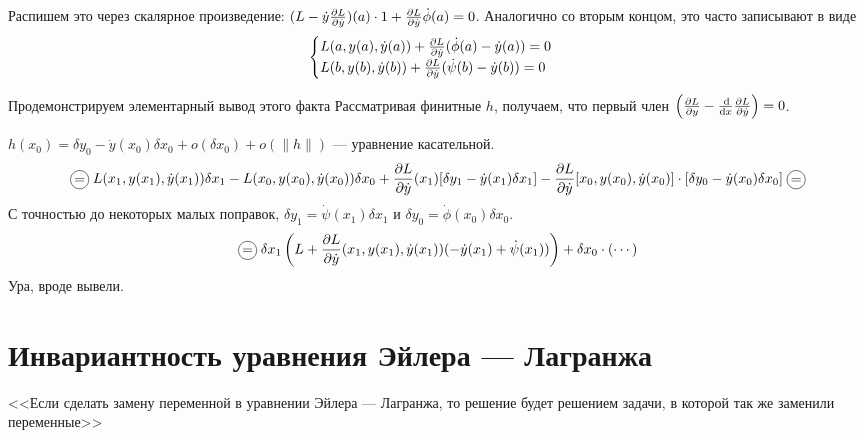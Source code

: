 \documentclass[a4paper]{article}
\begin{document}
    Распишем это через скалярное произведение: $(L - \dot{y}\frac{\partial L}{\partial \dot{y}})(a) \cdot 1 + \frac{\partial L}{\partial \dot{y}}\dot{\phi}(a) = 0$.
    Аналогично со вторым концом, это часто записывают в виде
    \[\begin{cases}L(a, y(a), \dot{y}(a)) + \frac{\partial L}{\partial \dot{y}}(\dot{\phi}(a) - \dot{y}(a)) = 0 \\ L(b, y(b), \dot{y}(b)) + \frac{\partial L}{\partial \dot{y}}(\dot{\psi}(b) - \dot{y}(b)) = 0\end{cases}\]

    Продемонстрируем элементарный вывод этого факта
%
    Рассматривая финитные $h$, получаем, что первый член $\left(\frac{\partial L}{\partial y} - \frac{\operatorname{d}\!}{\operatorname{d}\! x}\frac{\partial L}{\partial \dot{y}}\right) = 0$.

    $h(x_0) = \delta y_0 - \dot{y}(x_0)\delta x_0 + o(\delta x_0) + o(\|h\|)$ --- уравнение касательной.
    \[\circlesign{=}L(x_1, y(x_1), \dot{y}(x_1))\delta x_1 - L(x_0, y(x_0), \dot{y}(x_0))\delta x_0 + \der{L}{\dot{y}}(x_1)[\delta y_1 - \dot{y}(x_1)\delta x_1] - \der{L}{\dot{y}}[x_0, y(x_0), \dot{y}(x_0)] \cdot [\delta y_0 - \dot{y}(x_0)\delta x_0]\circlesign{=}\]
    С точностью до некоторых малых поправок, $\delta y_1 = \dot{\psi}(x_1)\delta x_1$ и $\delta y_0 = \dot{\phi}(x_0)\delta x_0$.
    \[\circlesign{=}\delta  x_1\left(L + \der{L}{\dot{y}}(x_1, y(x_1), \dot{y}(x_1))(-\dot{y}(x_1) + \dot{\psi}(x_1))\right) + \delta x_0 \cdot (\cdots)\]
    Ура, вроде вывели.
    \section{Инвариантность уравнения Эйлера --- Лагранжа}
    <<Если сделать замену переменной в уравнении Эйлера --- Лагранжа, то решение будет решением задачи, в которой так же заменили переменные>>
\end{document}
